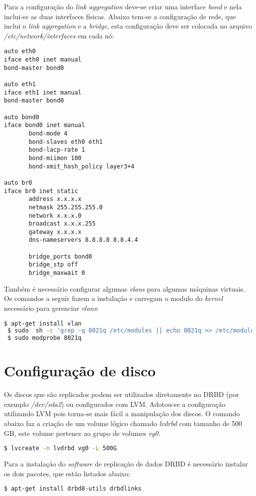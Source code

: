 Para a configuração do \textit{link aggregation} deve-se criar uma interface \textit{bond} e nela inclui-se as duas interfaces físicas.
Abaixo tem-se a configuração de rede, que inclui o \textit{link aggregation} e a \textit{bridge}, esta configuração deve ser colocada no 
arquivo \textit{/etc/network/interfaces} em cada nó:
\begin{lstlisting}
auto eth0
iface eth0 inet manual
bond-master bond0

auto eth1
iface eth1 inet manual
bond-master bond0

auto bond0
iface bond0 inet manual
       bond-mode 4
       bond-slaves eth0 eth1
       bond-lacp-rate 1
       bond-miimon 100
       bond-xmit_hash_policy layer3+4

auto br0
iface br0 inet static
       address x.x.x.x
       netmask 255.255.255.0
       network x.x.x.0
       broadcast x.x.x.255
       gateway x.x.x.x
       dns-nameservers 8.8.8.8 8.8.4.4
       
       bridge_ports bond0
       bridge_stp off
       bridge_maxwait 0
\end{lstlisting}

Também é necessário configurar algumas \textit{vlans} para algumas máquinas virtuais. Os comandos a seguir fazem a instalação e carregam
o modulo do \textit{kernel} necessário para gerenciar \textit{vlans}:
\begin{lstlisting}[language=bash]
 $ apt-get install vlan
 $ sudo  sh -c 'grep -q 8021q /etc/modules || echo 8021q >> /etc/modules'
 $ sudo modprobe 8021q
\end{lstlisting}

\section{Configuração de disco}
\label{ap:confdisco}

Os discos que são replicados podem ser utilizados diretamente no \ac{DRBD} (por exemplo \textit{/dev/sda2}) ou configurados com \ac{LVM}. Adotou-se
a configuração utilizando \ac{LVM} pois torna-se mais fácil a manipulação dos discos. O comando abaixo faz a criação de um volume lógico chamado 
\textit{lvdrbd} com tamanho de 500 GB, este volume pertence ao grupo de volumes \textit{vg0}.
\begin{lstlisting}[language=bash]
 $ lvcreate -n lvdrbd vg0 -L 500G
\end{lstlisting}

Para a instalação do \textit{software} de replicação de dados \ac{DRBD} é necessário instalar os dois pacotes, que estão listados abaixo:
\begin{lstlisting}[language=bash]
 $ apt-get install drbd8-utils drbdlinks
\end{lstlisting}

